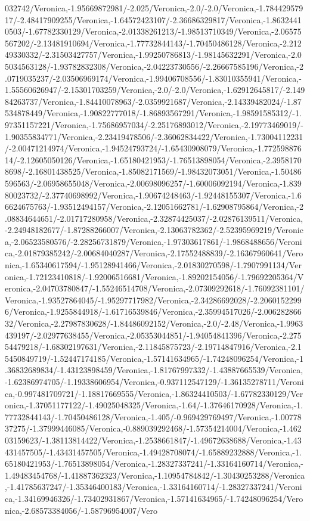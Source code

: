 {\begin{tikzternal}
032742/Veronica,-1.95669872981/-2.025/Veronica,-2.0/-2.0/Veronica,-1.78442957917/-2.48417909255/Veronica,-1.64572423107/-2.36686329817/Veronica,-1.86324410503/-1.67782330129/Veronica,-2.01338261213/-1.98513710349/Veronica,-2.06575567202/-2.13481910694/Veronica,-1.77732844143/-1.70450486128/Veronica,-2.21249330332/-2.31503427757/Veronica,-1.99250786813/-1.98145632291/Veronica,-2.05034563128/-1.93782832308/Veronica,-2.04223730556/-2.26667585196/Veronica,-2.0719035237/-2.03506969174/Veronica,-1.99406708556/-1.83010355941/Veronica,-1.55560626947/-2.15301703259/Veronica,-2.0/-2.0/Veronica,-1.62912645817/-2.14984263737/Veronica,-1.84410078963/-2.0359921687/Veronica,-2.14339482024/-1.87534878449/Veronica,-1.90822777018/-1.86893567291/Veronica,-1.98591585312/-1.97351157221/Veronica,-1.75686957034/-2.25176893012/Veronica,-2.19773469019/-1.90355834771/Veronica,-2.23419478506/-2.36062834422/Veronica,-1.73004112231/-2.00471214974/Veronica,-1.94524793724/-1.65430908079/Veronica,-1.77259887614/-2.12605050126/Veronica,-1.65180421953/-1.76513898054/Veronica,-2.39581708698/-2.16801438525/Veronica,-1.85082171569/-1.98432073051/Veronica,-1.50486596563/-2.06958655048/Veronica,-2.00698096257/-1.60006092194/Veronica,-1.83980023732/-2.37740698992/Veronica,-1.90674248463/-1.92448155307/Veronica,-1.66624675763/-1.93512494157/Veronica,-2.12051662781/-1.62908795864/Veronica,-2.08834644651/-2.01717280958/Veronica,-2.32874425037/-2.02876139511/Veronica,-2.24948182677/-1.87288266007/Veronica,-2.13063782362/-2.52395969219/Veronica,-2.06523580576/-2.28256731879/Veronica,-1.97303617861/-1.9868488656/Veronica,-2.01879385242/-2.00684040287/Veronica,-2.17552488839/-2.16367960641/Veronica,-1.65340617594/-1.95128941466/Veronica,-2.01830270598/-1.7907991134/Veronica,-1.72123410818/-1.92006516681/Veronica,-1.89202154056/-1.79692205364/Veronica,-2.04703780847/-1.55246514708/Veronica,-2.07309292618/-1.76092381101/Veronica,-1.93527864045/-1.95297717982/Veronica,-2.34286692028/-2.20601522996/Veronica,-1.9255844918/-1.61716539846/Veronica,-2.35994517026/-2.00628286632/Veronica,-2.27987830628/-1.84486092152/Veronica,-2.0/-2.48/Veronica,-1.9963439197/-2.02977638455/Veronica,-2.05353044851/-1.94054841396/Veronica,-2.27554479218/-1.68302197631/Veronica,-2.11845875723/-2.19714847916/Veronica,-2.15450849719/-1.52447174185/Veronica,-1.57141634965/-1.74248096254/Veronica,-1.36832689834/-1.43123898459/Veronica,-1.81767997332/-1.43887665539/Veronica,-1.62386974705/-1.19338606954/Veronica,-0.937112547129/-1.36135278711/Veronica,-0.997481709721/-1.18817669555/Veronica,-1.86324410503/-1.67782330129/Veronica,-1.37051177122/-1.49025048325/Veronica,-1.64/-1.37646170928/Veronica,-1.77732844143/-1.70450486128/Veronica,-1.405/-0.969429769497/Veronica,-1.0077837275/-1.37999446085/Veronica,-0.889039292468/-1.57354214004/Veronica,-1.46203159623/-1.38113814422/Veronica,-1.2538661847/-1.49672638688/Veronica,-1.43431457505/-1.43431457505/Veronica,-1.49428708074/-1.65889232888/Veronica,-1.65180421953/-1.76513898054/Veronica,-1.28327337241/-1.33164160714/Veronica,-1.49483454768/-1.41887362323/Veronica,-1.10954784842/-1.30430253288/Veronica,-1.41785637247/-1.35346400183/Veronica,-1.33164160714/-1.28327337241/Veronica,-1.34169946326/-1.73402931867/Veronica,-1.57141634965/-1.74248096254/Veronica,-2.68573384056/-1.58796954007/Vero
\end{tikzternal}}
